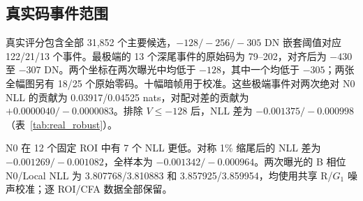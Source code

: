 \documentclass[10pt,twocolumn,journal]{IEEEtran}
\begin{document}
\subsection{真实码事件范围}\label{sec:realcode}
真实评分包含全部 31,852 个主要候选，$-128/-256/-305$ DN 嵌套阈值对应 122/21/13 个事件。最极端的 13 个深尾事件的原始码为 79--202，对齐后为 $-430$ 至 $-307$ DN。两个坐标在两次曝光中均低于 $-128$，其中一个均低于 $-305$；两张全幅图另有 18/25 个原始零码。十幅暗帧用于校准。这些极端事件对两次绝对 N0 NLL 的贡献为 0.03917/0.04525 nats，对配对差的贡献为 $+0.0000040/-0.0000083$。排除 $V\leq-128$ 后，NLL 差为 $-0.001375/-0.000998$（表~\ref{tab:real_robust}）。

N0 在 12 个固定 ROI 中有 7 个 NLL 更低。对称 1\% 缩尾后的 NLL 差为 $-0.001269/-0.001082$，全样本为 $-0.001342/-0.000964$。两次曝光的 B 相位 N0/Local NLL 为 3.807768/3.810883 和 3.857925/3.859954，均使用共享 R/$G_1$ 噪声校准；逐 ROI/CFA 数据全部保留。
\end{document}
